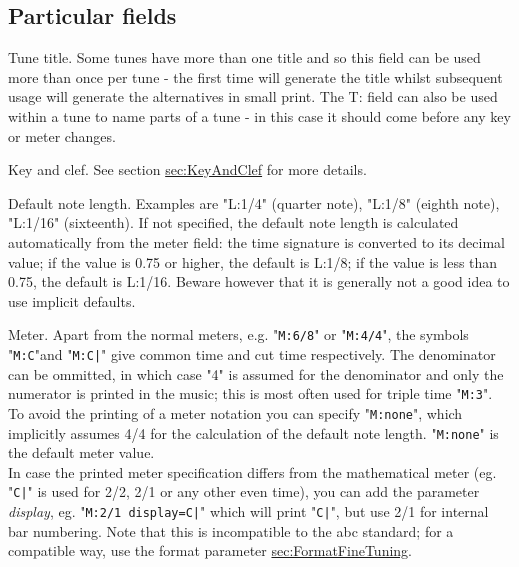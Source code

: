 \documentclass[a4paper]{article}
\begin{document}
\subsection{Particular fields}
\begin{description}

\item[T:] Tune title. 
Some tunes have more than one title and  so  this
field  can  be used more than once per tune - the first time will
generate the title whilst  subsequent  usage  will  generate  the
alternatives  in  small  print.   The  T:  field can also be used
within a tune to name parts of a tune - in this  case  it  should
come before any key or meter changes.

\item[K:] Key and clef. See section 
\hyperref{key and clef}{}{}{sec:KeyAndClef} for
more details.

\item[L:] Default note length. 
Examples are "L:1/4" (quarter note),  
"L:1/8" (eighth note), "L:1/16" (sixteenth). If not specified, the
default note length is calculated automatically from the meter  field:
the time signature is converted to its decimal value; if the value is 
0.75 or higher, the default is L:1/8; if the value is less than 0.75, 
the default is L:1/16. Beware however that it is generally not a good idea
to use implicit defaults.

\item[M:] Meter. 
Apart from the normal meters, e.g. "\verb$M:6/8$" or 
"\verb$M:4/4$", the symbols "\verb$M:C$"and "\verb$M:C|$"
give common time and cut time respectively. The denominator
can be ommitted, in which case "4" is assumed for the denominator
and only the numerator is printed in the music; this is most often
used for triple time "\verb$M:3$".\\
To avoid the printing of a meter notation you can specify 
"\verb$M:none$", which implicitly assumes 4/4 for the calculation of 
the default note length. "\verb$M:none$" is the default meter value.\\
In case the printed meter specification differs from the mathematical
meter (eg. "\verb$C|$" is used for 2/2, 2/1 or any other even time),
you can add the parameter {\it display}, eg. "\verb$M:2/1 display=C|$"
which will print "\verb$C|$", but use 2/1 for internal bar numbering.
Note that this is incompatible to the abc standard; for a compatible
way, use the format parameter \hyperref{{\it \%\%meterdisplay}}{{\it \%\%meterdisplay} (see section }{)}{sec:FormatFineTuning}.


\end{description}
\end{document}
